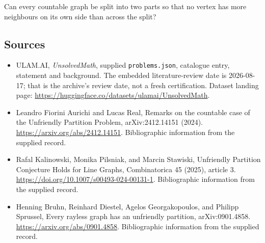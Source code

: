 \documentclass[11pt,a4paper]{article}
\begin{document}
Can every countable graph be split into two parts so that no vertex has more neighbours on its own side than across the split?

\subsection{Sources}

{\small

\begin{itemize}

\item[\hypertarget{source:statement:1}{S1}] ULAM.AI, \emph{UnsolvedMath}, supplied \texttt{problems.json}, catalogue entry, statement and background. The embedded literature-review date is 2026-08-17; that is the archive’s review date, not a fresh certification. Dataset landing page: \url{https://huggingface.co/datasets/ulamai/UnsolvedMath}.

\item[\hypertarget{source:statement:2}{S2}] Leandro Fiorini Aurichi and Lucas Real, Remarks on the countable case of the Unfriendly Partition Problem, arXiv:2412.14151 (2024). \url{https://arxiv.org/abs/2412.14151}. Bibliographic information from the supplied record.

\item[\hypertarget{source:statement:3}{S3}] Rafal Kalinowski, Monika Pilsniak, and Marcin Stawiski, Unfriendly Partition Conjecture Holds for Line Graphs, Combinatorica 45 (2025), article 3. \url{https://doi.org/10.1007/s00493-024-00131-1}. Bibliographic information from the supplied record.

\item[\hypertarget{source:statement:4}{S4}] Henning Bruhn, Reinhard Diestel, Agelos Georgakopoulos, and Philipp Sprussel, Every rayless graph has an unfriendly partition, arXiv:0901.4858. \url{https://arxiv.org/abs/0901.4858}. Bibliographic information from the supplied record.

\end{itemize}

}

\label{end:statement}
\end{document}
